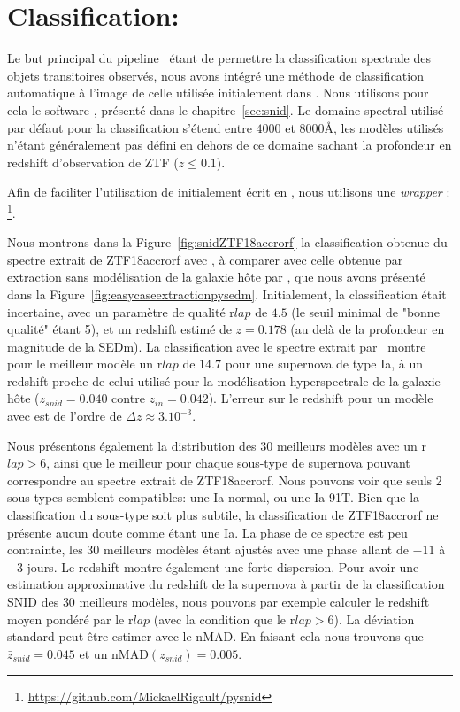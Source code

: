 \documentclass[../main/main.tex]{subfiles}
\begin{document}
\section{Classification: }\label{sec:snidclassification}

Le but principal du pipeline \hypergal\ étant de
permettre la classification spectrale des objets transitoires
observés, nous avons intégré une méthode de classification automatique à l'image de celle
utilisée initialement dans . Nous utilisons pour cela le
software , présenté dans le chapitre~\ref{sec:snid}. Le
domaine spectral utilisé par défaut pour la classification s'étend entre
$4000$ et $8000$\AA, les modèles utilisés n'étant généralement pas
défini en dehors de ce domaine sachant la profondeur en redshift
d'observation de ZTF ($z\leq0.1$). 

Afin de faciliter l'utilisation de  initialement écrit en
, nous utilisons une \textit{wrapper} :
\footnote{\url{https://github.com/MickaelRigault/pysnid}}.

Nous montrons dans la Figure~\ref{fig:snidZTF18accrorf} la
classification obtenue du spectre extrait de ZTF18accrorf avec \hypergal, à comparer
avec celle obtenue par extraction sans modélisation de la galaxie hôte
par \pysedm, que nous avons présenté dans la
Figure~\ref{fig:easycaseextractionpysedm}. Initialement, la
classification était incertaine, avec un paramètre de qualité
r$lap$ de $4.5$ (le seuil minimal de "bonne qualité" étant 5), et un
redshift estimé de $z=0.178$ (au delà de la profondeur en magnitude de
la SEDm).
La classification avec le spectre extrait par \hypergal\ montre pour le
meilleur modèle un r$lap$ de $14.7$ pour une supernova de type Ia, à un
redshift proche de celui utilisé pour la modélisation hyperspectrale de
la galaxie hôte ($z_{snid}=0.040$
contre $z_{in}=0.042$). L'erreur sur le redshift pour un modèle avec  est
de l'ordre de $\Delta z\approx3.10^{-3}$. 

Nous présentons également la distribution des $30$ meilleurs modèles avec un
r$lap>6$, ainsi que le meilleur pour chaque sous-type de supernova
pouvant correspondre au spectre extrait de ZTF18accrorf. Nous pouvons
voir que seuls 2 sous-types semblent compatibles: une Ia-normal, ou une
Ia-91T. Bien que la classification du sous-type soit plus subtile, la
classification de ZTF18accrorf ne présente aucun doute comme étant une
Ia. La phase de ce spectre est peu contrainte, les $30$ meilleurs
modèles étant ajustés avec une phase allant de $-11$ à $+3$ jours.
Le redshift montre également une forte dispersion. Pour avoir une
estimation approximative du redshift de la supernova à partir de la
classification SNID des $30$ meilleurs modèles, nous pouvons par exemple calculer le redshift
moyen pondéré par le r$lap$ (avec la condition que le r$lap>6$). La
déviation standard peut être estimer avec le nMAD. En
faisant cela nous trouvons que $\bar{z}_{snid}=0.045$ et un nMAD$(z_{snid})=0.005$. 
\end{document}
